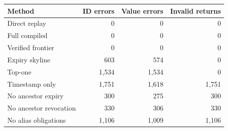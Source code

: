 \begin{tabular}{lrrr}
\toprule
Method & ID errors & Value errors & Invalid returns\\
\midrule
Direct replay & 0 & 0 & 0\\
Full compiled & 0 & 0 & 0\\
Verified frontier & 0 & 0 & 0\\
Expiry skyline & 603 & 574 & 0\\
Top-one & 1,534 & 1,534 & 0\\
Timestamp only & 1,751 & 1,618 & 1,751\\
No ancestor expiry & 300 & 275 & 300\\
No ancestor revocation & 330 & 306 & 330\\
No alias obligations & 1,106 & 1,009 & 1,106\\
\bottomrule
\end{tabular}
